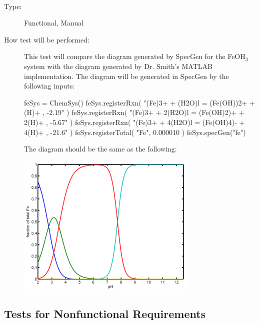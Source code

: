 \documentclass[12pt, titlepage]{article}
\newcommand{\progname}{SpecGen}
\newcounter{testnum} %
\begin{document}
\newpage
{}\\
\begin{addmargin}[2em]{0em}
\begin{description}
\item[Type:] Functional, Manual
					
\item[How test will be performed:] This test will compare the diagram generated 
by \progname{} for the FeOH$_3$ system with the diagram generated by Dr. Smith's
MATLAB implementation.  The diagram will be generated in \progname{} by the following
inputs:

\begin{python}
feSys = ChemSys()
feSys.registerRxn(
  "(Fe)3+ + (H2O)l = (Fe(OH))2+ + (H)+ , -2.19"
)
feSys.registerRxn(
  "(Fe)3+ + 2(H2O)l = (Fe(OH)2)+ + 2(H)+ , -5.67"
)
feSys.registerRxn(
  "(Fe)3+ + 4(H2O)l = (Fe(OH)4)- + 4(H)+ , -21.6"
)
feSys.registerTotal(
  "Fe", 0.000010
)
feSys.specGen("fe")
\end{python}

The diagram should be the same as the following:

\includegraphics[width=0.7\textwidth]{orig_ref}\\
\end{description}
\end{addmargin}



\subsection{Tests for Nonfunctional Requirements}
\end{document}
